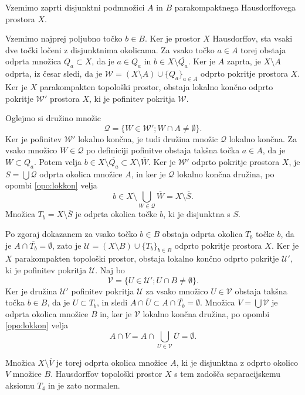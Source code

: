 \documentclass[mat1]{fmfdelo}
\newcommand{\Ucurl}{\mathcal{U}}
\newcommand{\closure}[1]{\overline{#1}}
\begin{document}
\begin{dokaz}
Vzemimo zaprti disjunktni podmnožici $A$ in $B$ parakompaktnega Hausdorff\-o\-ve\-ga prostora $X$.

Vzemimo najprej poljubno točko $b \in B$. Ker je prostor $X$ Hausdorffov, sta vsaki dve točki ločeni z disjunktnima okolicama. Za vsako točko $a \in A$ torej obstaja odprta množica $Q_a \subset X$, da je $a \in Q_a$ in $b \in X \setminus \closure{Q_a}$. Ker je $A$ zaprta, je $X \setminus A$ odprta, iz česar sledi, da je $\mathcal{W} = (X \setminus A)\cup \lbrace Q_a\rbrace_{a \in A}$ odprto pokritje prostora $X$. Ker je $X$ parakompakten topološki prostor, obstaja lokalno končno odprto pokritje $\mathcal{W}'$ prostora $X$, ki je pofinitev pokritja $\mathcal{W}$.

Oglejmo si družino množic \[ \mathcal{Q} = \lbrace W \in \mathcal{W}'; W \cap A \neq \emptyset \rbrace. \]
Ker je pofinitev $\mathcal{W}'$ lokalno končna, je tudi družina množic $\mathcal{Q}$ lokalno končna.
Za vsako množico $W \in \mathcal{Q}$ po definiciji pofinitve obstaja takšna točka $a \in A$, da je $W \subset Q_a$.
 Potem velja $b \in X \setminus \closure{Q_a} \subset X \setminus \closure{W}$. Ker je $\mathcal{W}'$ odprto pokritje prostora $X$, je $S = \bigcup\mathcal{Q}$ odprta okolica množice $A$, in ker je $\mathcal{Q}$ lokalno končna družina, po opombi \ref{opo:lokkon} velja \[ b \in X \setminus \bigcup_{W \in \mathcal{Q}} \closure{W} = X \setminus \closure{S}. \] Množica $T_b = X \setminus \closure{S}$ je odprta okolica točke $b$, ki je disjunktna s $S$.

Po zgoraj dokazanem za vsako točko $b \in B$ obstaja odprta okolica $T_b$ točke $b$, da je $A \cap \closure{T_b} = \emptyset$, zato je $\Ucurl = (X\setminus B) \cup \lbrace T_b \rbrace_{b \in B}$ odprto pokritje prostora $X$. Ker je $X$ parakompakten topološki prostor, obstaja lokalno končno odprto pokritje $\Ucurl'$, ki je pofinitev pokritja $\Ucurl$. Naj bo \[ \mathcal{V} = \lbrace U \in \Ucurl' ; U \cap B \neq \emptyset \rbrace. \]
Ker je družina $\Ucurl'$ pofinitev pokritja $\Ucurl$ za vsako množico $U \in \mathcal{V}$ obstaja takšna točka $b \in B$, da je $U \subset T_b$, in sledi $A \cap \closure{U} \subset A \cap \closure{T_b} = \emptyset$. Množica $V = \bigcup \mathcal{V}$ je odprta okolica množice $B$ in, ker je $\mathcal{V}$ lokalno končna družina, po opombi \ref{opo:lokkon} velja \[ A \cap \closure{V} = A \cap \bigcup_{U \in \mathcal{V}}\closure{U} = \emptyset.\]

Množica $X \setminus \closure{V}$ je torej odprta okolica množice $A$, ki je disjunktna z odprto okolico $V$ množice $B$. Hausdorffov topološki prostor $X$ s tem zadošča separacijskemu aksiomu $T_4$ in je zato normalen.
\end{dokaz}
\end{document}
